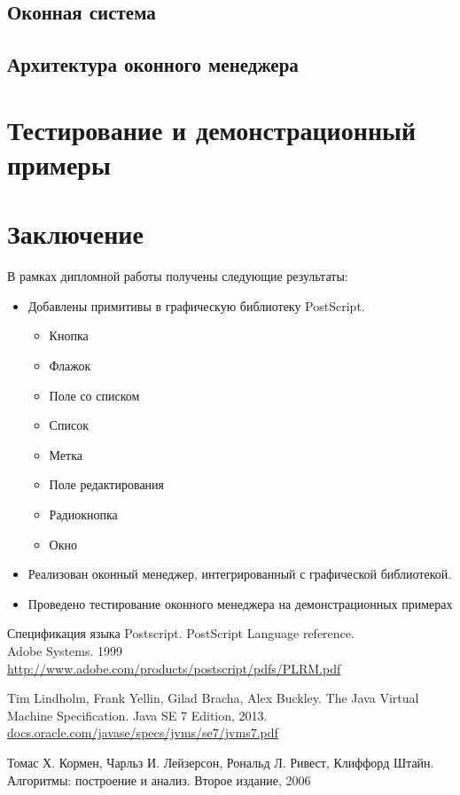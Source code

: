 \documentclass[14pt]{extarticle}
\begin{document}
	\subsection{ Оконная система }
	\subsection{ Архитектура оконного менеджера}
	\pagebreak
	\section{Тестирование и демонстрационный примеры}

	\pagebreak
	
	\section*{Заключение}
	
	В рамках дипломной работы получены следующие результаты:
	\begin{itemize}
		\item Добавлены примитивы в графическую библиотеку  PostScript.
		\begin{itemize}
			\item Кнопка
			\item Флажок
			\item Поле со списком
			\item Список
			\item Метка
			\item Поле редактирования
			\item Радиокнопка
			\item Окно
		\end{itemize}
		\item Реализован оконный менеджер, интегрированный с графической библиотекой.
		\item Проведено тестирование оконного менеджера на демонстрационных примерах
	\end{itemize}
	

	
	\pagebreak
	
	
	
	\begin{thebibliography}{}
		
		Спецификация языка Postscript. PostScript Language reference. \\
		Adobe Systems. 1999\\
		\url{http://www.adobe.com/products/postscript/pdfs/PLRM.pdf}
		
		Tim Lindholm, Frank Yellin, Gilad Bracha, Alex Buckley.
		The Java Virtual Machine Specification.
		Java SE 7 Edition, 2013. \\
		\url{docs.oracle.com/javase/specs/jvms/se7/jvms7.pdf}
		
		Томас Х. Кормен, Чарльз И. Лейзерсон, Рональд Л. Ривест, Клиффорд Штайн.
		Алгоритмы: построение и анализ.
		Второе издание, 2006
		
	\end{thebibliography}
\end{document}
